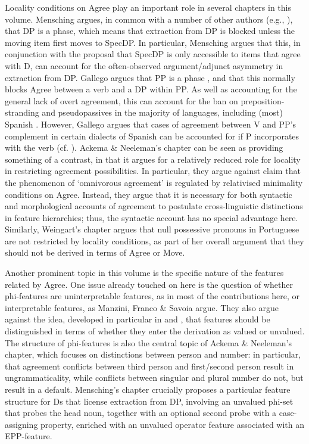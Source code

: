 \documentclass[output=paper]{langsci/langscibook}
\begin{document}
Locality conditions on Agree play an important role in several chapters in this volume. Mensching argues, in common with a number of other authors (e.g., \citealt{Svenonius2004,Bošković2005,Heck2009,Reeve2018}), that DP is a phase, which means that extraction from DP is blocked unless the moving item first moves to SpecDP. In particular, Mensching argues that this, in conjunction with the proposal that SpecDP is only accessible to items that agree with D, can account for the often-observed argument/adjunct asymmetry in extraction from DP. Gallego argues that PP is a phase \citep{Abels2003,Abels2012}, and that this normally blocks Agree between a verb and a DP within PP. As well as accounting for the general lack of overt agreement, this can account for the ban on preposition-stranding and pseudopassives in the majority of languages, including (most) Spanish \citep{Law2006}. However, Gallego argues that cases of agreement between V and PP’s complement in certain dialects of Spanish can be accounted for if P incorporates with the verb (cf. \citealt{Hornstein1981,Law2006}). Ackema \& Neeleman’s chapter can be seen as providing something of a contrast, in that it argues for a relatively reduced role for locality in restricting agreement possibilities. In particular, they argue against  claim that the phenomenon of ‘omnivorous agreement’ is regulated by relativised minimality conditions on Agree. Instead, they argue that it is necessary for both syntactic and morphological accounts of agreement to postulate cross-linguistic distinctions in feature hierarchies; thus, the syntactic account has no special advantage here. Similarly, Weingart’s chapter argues that null possessive pronouns in Portuguese are not restricted by locality conditions, as part of her overall argument that they should not be derived in terms of Agree or Move.

Another prominent topic in this volume is the specific nature of the features related by Agree. One issue already touched on here is the question of whether phi-features are uninterpretable features, as in most of the contributions here, or interpretable features, as Manzini, Franco \& Savoia argue. They also argue against the idea, developed in particular in \citet{Chomsky2000} and \citet{Pesetsky2007b}, that features should be distinguished in terms of whether they enter the derivation as valued or unvalued. The structure of phi-features is also the central topic of Ackema \& Neeleman’s chapter, which focuses on distinctions between person and number: in particular, that agreement conflicts between third person and first\slash second person result in ungrammaticality, while conflicts between singular and plural number do not, but result in a default. Mensching’s chapter crucially proposes a particular feature structure for Ds that license extraction from DP, involving an unvalued phi-set that probes the head noun, together with an optional second probe with a case-assigning property, enriched with an unvalued operator feature associated with an EPP-feature.
\end{document}
